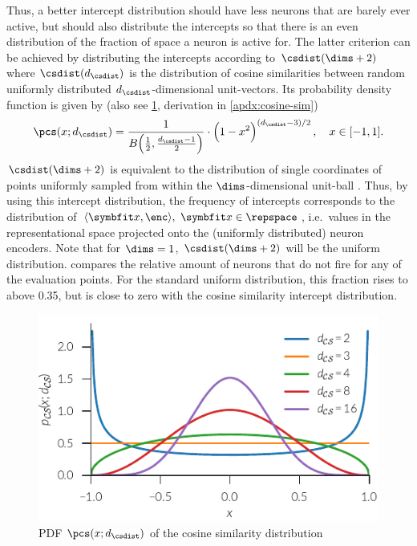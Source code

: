 Thus, a better intercept distribution should have less neurons that are barely ever active, but should also distribute the intercepts so that there is an even distribution of the fraction of space a neuron is active for.
The latter criterion can be achieved by distributing the intercepts according to $\csdist(\dims+2)$ where $\csdist(d_{\csdist})$ is the distribution of cosine similarities between random uniformly distributed $d_{\csdist}$-dimensional unit-vectors.
Its probability density function is given by (also see \cref{fig:cosine-sim}, derivation in \cref{apdx:cosine-sim})
\begin{equation}
\pcs(x; d_{\csdist}) = \frac{1}{B\!\del{\frac{1}{2}, \frac{d_{\csdist} - 1}{2}}} \cdot \del{1 - x^2}^{\del{d_{\csdist} - 3} / 2},\quad x \in [-1, 1] \text{.}\label{eqn:pcs}
\end{equation}
$\csdist(\dims+2)$ is equivalent to the distribution of single coordinates of points uniformly sampled from within the $\dims$-dimensional unit-ball \parencite{voelker2017}.
Thus, by using this intercept distribution, the frequency of intercepts corresponds to the distribution of $\langle \vc x, \enc \rangle,\ \vc x \in \repspace$, i.e.\ values in the representational space projected onto the (uniformly distributed) neuron encoders.
Note that for $\dims = 1$, $\csdist(\dims + 2)$ will be the uniform distribution.
 compares the relative amount of neurons that do not fire for any of the evaluation points.
For the standard uniform distribution, this fraction rises to above \num{0.35}, but is close to zero with the cosine similarity intercept distribution.
\begin{figure}
    \centering
    \includegraphics{figures/cosine-sim}
    \caption{PDF $\pcs(x; d_{\csdist})$ of the cosine similarity distribution}\label{fig:cosine-sim}
\end{figure}
